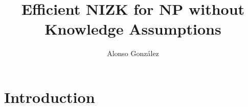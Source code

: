 \documentclass{llncs}
\author{Alonso Gonz\'alez \inst{1}}
\institute{Mi casita}
\title{Efficient NIZK for NP without Knowledge Assumptions}
\begin{document}

\maketitle
\begin{abstract}
    
\end{abstract} 

\section{Introduction}

    
        
    

        


    
%	



\end{document}
